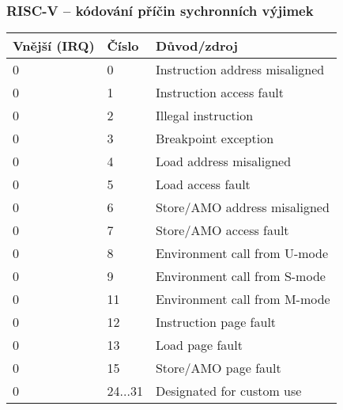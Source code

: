 \documentclass{beamer}
\begin{document}
\begin{frame}
\frametitle{RISC-V -- kódování příčin sychronních výjimek}

\begin{center}
\small
\begin{tabular}{|l|l|l|}  \hline
Vnější (IRQ) & Číslo & Důvod/zdroj \\\hline
0 & 0 &Instruction address misaligned \\\hline
0 & 1 & Instruction access fault \\\hline
0 & 2 & Illegal instruction \\\hline
0 & 3 & Breakpoint exception \\\hline
0 & 4 & Load address misaligned \\\hline
0 & 5 & Load access fault \\\hline
0 & 6 & Store/AMO address misaligned \\\hline
0 & 7 & Store/AMO access fault \\\hline
0 & 8 & Environment call from U-mode \\\hline
0 & 9 & Environment call from S-mode \\\hline
0 & 11 & Environment call from M-mode \\\hline
0 & 12 & Instruction page fault \\\hline
0 & 13 & Load page fault \\\hline
0 & 15 & Store/AMO page fault \\\hline
0 & 24...31 &Designated for custom use \\\hline
\end{tabular}
\end{center}
\end{frame}
\end{document}
